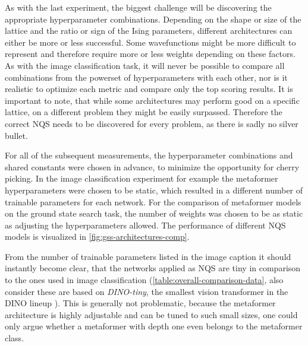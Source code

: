 As with the last experiment, the biggest challenge will be discovering the appropriate hyperparameter combinations.
Depending on the shape or size of the lattice and the ratio or sign of the Ising parameters, different architectures can either be more or less successful.
Some wavefunctions might be more difficult to represent and therefore require more or less weights depending on these factors.
As with the image classification task, it will never be possible to compare all combinations from the powerset of hyperparameters with each other, nor is it realistic to optimize each metric and compare only the top scoring results.
It is important to note, that while some architectures may perform good on a specific lattice, on a different problem they might be easily surpassed. 
Therefore the correct NQS needs to be discovered for every problem, as there is sadly no silver bullet.

For all of the subsequent measurements, the hyperparameter combinations and shared constants were chosen in advance, to minimize the opportunity for cherry picking.
In the image classification experiment for example the metaformer hyperparameters were chosen to be static, which resulted in a different number of trainable parameters for each network.
For the comparison of metaformer models on the ground state search task, the number of weights was chosen to be as static as adjusting the hyperparameters allowed. 
The performance of different NQS models is visualized in \autoref{fig:gss-architectures-comp}.

From the number of trainable parameters listed in the image caption it should instantly become clear, that the networks applied as NQS are tiny in comparison to the ones used in image classification (\autoref{table:overall-comparison-data}, also consider these are based on \emph{DINO-tiny}, the smallest vision transformer in the DINO lineup \cite{dinoGithub}).
This is generally not problematic, because the metaformer architecture is highly adjustable and can be tuned to such small sizes, one could only argue whether a metaformer with depth one even belongs to the metaformer class.

